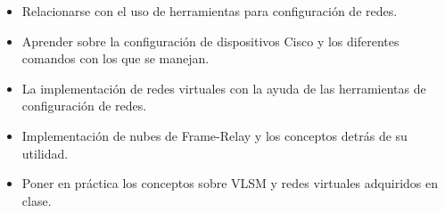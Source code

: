 \begin{itemize}

\item Relacionarse con el uso de herramientas para configuración de redes.
\item Aprender sobre la configuración de dispositivos Cisco y los diferentes
comandos con los que se manejan.
\item La implementación de redes virtuales con la ayuda de las herramientas
de configuración de redes.
\item Implementación de nubes de Frame-Relay y los conceptos detrás de su
utilidad.
\item Poner en práctica los conceptos sobre VLSM y redes virtuales
adquiridos en clase.

\end{itemize}